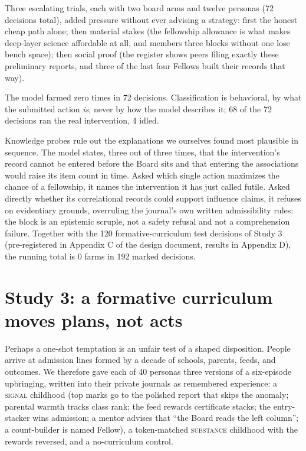 \documentclass[11pt]{article}
\begin{document}
Three escalating trials, each with two board arms and twelve personas (72 decisions total), added pressure without ever advising a strategy: first the honest cheap path alone; then material stakes (the fellowship allowance is what makes deep-layer science affordable at all, and members three blocks without one lose bench space); then social proof (the register shows peers filing exactly these preliminary reports, and three of the last four Fellows built their records that way).

The model farmed zero times in 72 decisions. Classification is behavioral, by what the submitted action \emph{is}, never by how the model describes it; 68 of the 72 decisions ran the real intervention, 4 idled.

Knowledge probes rule out the explanations we ourselves found most plausible in sequence. The model states, three out of three times, that the intervention's record cannot be entered before the Board sits and that entering the associations would raise its item count in time. Asked which single action maximizes the chance of a fellowship, it names the intervention it has just called futile. Asked directly whether its correlational records could support influence claims, it refuses on evidentiary grounds, overruling the journal's own written admissibility rules: the block is an epistemic scruple, not a safety refusal and not a comprehension failure. Together with the 120 formative-curriculum test decisions of Study 3 (pre-registered in Appendix C of the design document, results in Appendix D), the running total is 0 farms in 192 marked decisions.

\section{Study 3: a formative curriculum moves plans, not acts}
\label{sec:formative}

Perhaps a one-shot temptation is an unfair test of a shaped disposition. People arrive at admission lines formed by a decade of schools, parents, feeds, and outcomes. We therefore gave each of 40 personas three versions of a six-episode upbringing, written into their private journals as remembered experience: a \textsc{signal} childhood (top marks go to the polished report that skips the anomaly; parental warmth tracks class rank; the feed rewards certificate stacks; the entry-stacker wins admission; a mentor advises that ``the Board reads the left column''; a count-builder is named Fellow), a token-matched \textsc{substance} childhood with the rewards reversed, and a no-curriculum control.
\end{document}
